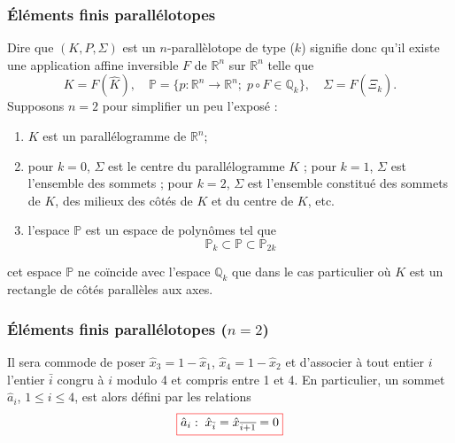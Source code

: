\documentclass{beamer}
\newcommand{\myredbox}[1]{\fcolorbox{red}{white}{$\displaystyle#1$}}
\begin{document}
\begin{frame}
\frametitle{Éléments finis parallélotopes}
Dire que $(K, P, \Sigma)$ est un $n$-parallèlotope de type 
($k$) signifie donc qu'il existe une application affine inversible $F$ de $\mathbb{R}^n$ sur $\mathbb{R}^n$ telle que
\begin{equation}
K=F(\widehat{K}),\quad \mathbb{P}=\{p: \mathbb{R}^n\to \mathbb{R}^n;\; p\circ F\in \mathbb{Q}_k\},\quad \Sigma=F(\widehat{\Xi}_k).
\end{equation}
Supposons $n=2$ pour simplifier un peu l'exposé :
\begin{enumerate}
\item $K$ est un parallélogramme de $\mathbb{R}^n$;
\item pour $k=0$, $\Sigma$ est le centre du parallélogramme $K$ ; pour $k =1$, $\Sigma$ est l'ensemble des sommets ; pour $k =2$, $\Sigma$ est l'ensemble constitué des sommets de $K$, des milieux des côtés de $K$ et du centre de $K$, etc.
\item l'espace $\mathbb{P}$ est un espace de polynômes tel que
\[\mathbb{P}_k\subset \mathbb{P}\subset \mathbb{P}_{2k}\]
\end{enumerate}

cet espace $\mathbb{P}$ ne coïncide avec l'espace $\mathbb{Q}_k$ que dans le cas particulier où $K$ est un rectangle de côtés parallèles aux axes.
\end{frame}

\begin{frame}
\frametitle{Éléments finis parallélotopes ($n = 2$)}
 \begin{center}
   \end{center}
Il sera commode de poser $\hat{x}_3=1-\hat{x}_1$, $\hat{x}_4=1-\hat{x}_2$
et d'associer à tout entier $i$ l'entier $\bar{i}$ congru à $i$ modulo 4 et compris entre 1 et 4.  En particulier, un sommet $\hat{a}_i$, $1\leq i \leq  4$, est alors défini par les relations
\[\myredbox{\hat{a}_i:\;\hat{x}_{\bar{i}}=\hat{x}_{\overline{i+1}}=0}\]

\end{frame}
\end{document}
